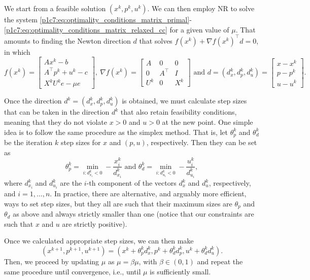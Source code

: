 We start from a feasible solution $(x^{k}, p^{k}, u^{k})$. We can then employ NR to solve the system \eqref{p1c7:eq:optimality_conditions_matrix_primal}-\eqref{p1c7:eq:optimality_conditions_matrix_relaxed_cc} for a given value of $\mu$. That amounts to finding the Newton direction $d$ that solves $f(x^k) + \nabla f(x^k)^\top d = 0$, in which
	\begin{equation*}
	f(x^k) = \begin{bmatrix}
				Ax^k - b \\
				A^\top p^k + u^k - c \\
				X^k U^k e - \mu e 
			   \end{bmatrix},	   
		\ \nabla f(x^k) = \begin{bmatrix}
					   A & 0 & 0 \\
					   0 & A^\top & I \\
					   U^k & 0 & X^k	
					  \end{bmatrix}
		 \text{ and } d = (d_x^k, d_p^k, d_u^k) = 
			\begin{bmatrix}
			x - x^k \\ 
			p - p^k \\
			u - u^k
		\end{bmatrix}.
	\end{equation*}	
	
Once the direction $d^k = (d_x^k, d_p^k, d_u^k)$ is obtained, we must calculate step sizes that can be taken in the direction $d^k$ that also retain feasibility conditions, meaning that they do not violate $x >0$ and $u > 0$ at the new point. One simple idea is to follow the same procedure as the simplex method. That is, let $\theta_p^k$ and $\theta_d^k$ be the iteration $k$ step sizes for $x$ and $(p,u)$, respectively. Then they can be set as
	\begin{equation*}
		\theta_p^k = \min_{i:d_{x_i}^k < 0} - \frac{x_i^k}{d_{x_i}^k} \text{ and }	\theta_d^k = \min_{i:d_{u_i}^k < 0} - \frac{u_i^k}{d_{u_i}^k},
	\end{equation*}
		where $d_{x_i}^k$ and $d_{u_i}^k$ are the $i$-th component of the vectors $d_x^k$ and $d_u^k$, respectively, and $i = 1, \dots, n$. In practice, there are alternative, and arguably more efficient, ways to set step sizes, but they all are such that their maximum sizes are $\theta_p$ and $\theta_d$ as above and always strictly smaller than one (notice that our constraints are such that $x$ and $u$ are strictly positive).
		
		Once we calculated appropriate step sizes, we can then make 
		$$
		(x^{k+1}, p^{k+1}, u^{k+1}) = (x^{k} + \theta_{p}^kd_x^k, p^{k} + \theta_d^k d_p^{k}, u^{k} + \theta_d^k d_u^k).
	$$
	Then, we proceed by updating $\mu$ as $\mu = \beta \mu$, with $\beta \in (0,1)$ and repeat the same procedure until convergence, i.e., until $\mu$ is sufficiently small.  
		
